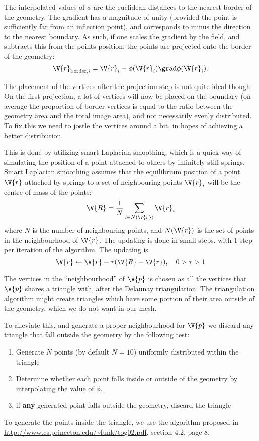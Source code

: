 \documentclass[sigconf]{acmart}
\begin{document}
The interpolated values of $ \phi $ are the euclidean distances to the nearest border of the geometry. The gradient has a magnitude of unity (provided the point is sufficiently far from an inflection point), and corresponds to minus the direction to the nearest boundary. As such, if one scales the gradient by the field, and subtracts this from the points position, the points are projected onto the border of the geometry:
\begin{equation}\label{key}
	\V{r}_{\text{border}, i} = \V{r}_{i} - \phi(\V{r}_i) \grad\phi(\V{r}_i).
\end{equation}

The placement of the vertices after the projection step is not quite ideal though. On the first projection, a lot of vertices will now be placed on the boundary (on average the proportion of border vertices is equal to the ratio between the geometry area and the total image area), and not necessarily evenly distributed. To fix this we need to jostle the vertices around a bit, in hopes of achieving a better distribution.

This is done by utilizing smart Laplacian smoothing, which is a quick way of simulating the position of a point attached to others by infinitely stiff springs. Smart Laplacian smoothing assumes that the equilibrium position of a point $ \V{r} $ attached by springs to a set of neighbouring points $ \V{r}_i $ will be the centre of mass of the points:
\begin{equation}\label{key}
	\V{R} = \frac{1}{N} \sum_{i \in N(\V{r})} \V{r}_i
\end{equation}
where $ N $ is the number of neighbouring points, and $ N(\V{r}) $ is the set of points in the neighbourhood of $ \V{r} $. The updating is done in small steps, with 1 step per iteration of the algorithm. The updating is
\begin{equation}\label{key}
	\V{r} \leftarrow \V{r} - \tau(\V{R} - \V{r}), \quad 0 > \tau > 1
\end{equation}

The vertices in the ``neighbourhood'' of $ \V{p} $ is chosen as all the vertices that $ \V{p} $ shares a triangle with, after the Delaunay triangulation. The triangulation algorithm might create triangles which have some portion of their area outside of the geometry, which we do not want in our mesh.

To alleviate this, and generate a proper neighbourhood for $ \V{p} $ we discard any triangle that fall outside the geometry by the following test:
\begin{enumerate}
	\item Generate $ N $ points (by default $ N = 10 $) uniformly distributed within the triangle
	\item Determine whether each point falls inside or outside of the geometry by interpolating the value of $ \phi $.
	\item if \textbf{any} generated point falls outside the geometry, discard the triangle
\end{enumerate}
To generate the points inside the triangle, we use the algorithm proposed in \url{http://www.cs.princeton.edu/~funk/tog02.pdf}, section 4.2, page 8.
\end{document}
